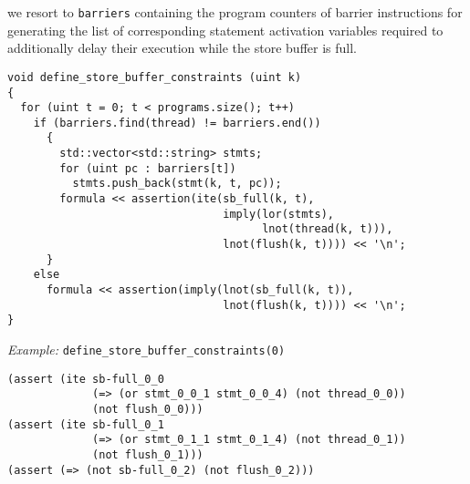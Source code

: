 we resort to \texttt{barriers} containing the program counters of barrier instructions for generating the list of corresponding statement activation variables required to additionally delay their execution while the store buffer is full.

\newpage

\begin{lstlisting}[style=c++]
void define_store_buffer_constraints (uint k)
{
  for (uint t = 0; t < programs.size(); t++)
    if (barriers.find(thread) != barriers.end())
      {
        std::vector<std::string> stmts;
        for (uint pc : barriers[t])
          stmts.push_back(stmt(k, t, pc));
        formula << assertion(ite(sb_full(k, t),
                                 imply(lor(stmts),
                                       lnot(thread(k, t))),
                                 lnot(flush(k, t)))) << '\n';
      }
    else
      formula << assertion(imply(lnot(sb_full(k, t)),
                                 lnot(flush(k, t)))) << '\n';
}
\end{lstlisting}

\noindent
\emph{Example:} \lstinline[style=c++]{define_store_buffer_constraints(0)}


\begin{lstlisting}[language=smtlib]
(assert (ite sb-full_0_0
             (=> (or stmt_0_0_1 stmt_0_0_4) (not thread_0_0))
             (not flush_0_0)))
(assert (ite sb-full_0_1
             (=> (or stmt_0_1_1 stmt_0_1_4) (not thread_0_1))
             (not flush_0_1)))
(assert (=> (not sb-full_0_2) (not flush_0_2)))
\end{lstlisting}

